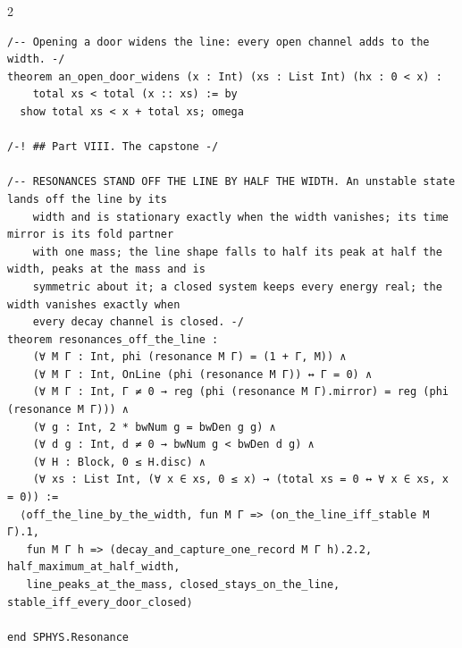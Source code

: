 \documentclass[10pt]{article}
\begin{document}
\begin{multicols}{2}
\begin{Verbatim}[fontsize=\fontsize{5.9}{6.8}\selectfont,breaklines,breakanywhere,breaksymbolleft={}]
/-- Opening a door widens the line: every open channel adds to the width. -/
theorem an_open_door_widens (x : Int) (xs : List Int) (hx : 0 < x) :
    total xs < total (x :: xs) := by
  show total xs < x + total xs; omega

/-! ## Part VIII. The capstone -/

/-- RESONANCES STAND OFF THE LINE BY HALF THE WIDTH. An unstable state lands off the line by its
    width and is stationary exactly when the width vanishes; its time mirror is its fold partner
    with one mass; the line shape falls to half its peak at half the width, peaks at the mass and is
    symmetric about it; a closed system keeps every energy real; the width vanishes exactly when
    every decay channel is closed. -/
theorem resonances_off_the_line :
    (∀ M Γ : Int, phi (resonance M Γ) = (1 + Γ, M)) ∧
    (∀ M Γ : Int, OnLine (phi (resonance M Γ)) ↔ Γ = 0) ∧
    (∀ M Γ : Int, Γ ≠ 0 → reg (phi (resonance M Γ).mirror) = reg (phi (resonance M Γ))) ∧
    (∀ g : Int, 2 * bwNum g = bwDen g g) ∧
    (∀ d g : Int, d ≠ 0 → bwNum g < bwDen d g) ∧
    (∀ H : Block, 0 ≤ H.disc) ∧
    (∀ xs : List Int, (∀ x ∈ xs, 0 ≤ x) → (total xs = 0 ↔ ∀ x ∈ xs, x = 0)) :=
  ⟨off_the_line_by_the_width, fun M Γ => (on_the_line_iff_stable M Γ).1,
   fun M Γ h => (decay_and_capture_one_record M Γ h).2.2, half_maximum_at_half_width,
   line_peaks_at_the_mass, closed_stays_on_the_line, stable_iff_every_door_closed⟩

end SPHYS.Resonance


\end{Verbatim}
\end{multicols}
\end{document}
